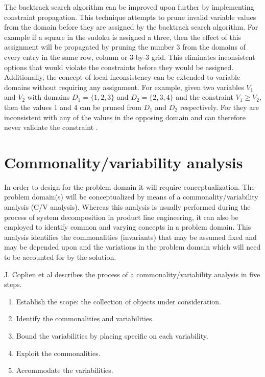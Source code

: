 The backtrack search algorithm can be improved upon further by implementing constraint propagation. This technique attempts to prune invalid variable values from the domain before they are assigned by the backtrack search algorithm. For example if a square in the sudoku is assigned a three, then the effect of this assignment will be propagated by pruning the number 3 from the domains of every entry in the same row, column or 3-by-3 grid. This eliminates inconsistent options that would violate the constraints before they would be assigned. Additionally, the concept of local inconsistency can be extended to variable domains without requiring any assignment. For example, given two variables $V_1$ and $V_2$ with domains $D_1=\{1,2,3\}$ and $D_2=\{2,3,4\}$ and the constraint $V_1 \geq V_2$, then the values 1 and 4 can be pruned from $D_1$ and $D_2$ respectively. For they are inconsistent with any of the values in the opposing domain and can therefore never validate the constraint \cite{constraint_general, constraint_algorithm}.
\section{Commonality/variability analysis}
\label{sec:back:cv_analysis}
In order to design for the problem domain it will require conceptualization. The problem domain(s) will be conceptualized by means of a commonality/variability analysis (C/V analysis). Whereas this analysis is usually performed during the process of system decomposition in product line engineering, it can also be employed to identify common and varying concepts in a problem domain. This analysis identifies the commonalities (invariants) that may be assumed fixed and may be depended upon and the variations in the problem domain which will need to be accounted for by the solution.

J. Coplien et al \cite{cv_analysis} describes the process of a commonality/variability analysis in five steps.
\begin{enumerate}
\nospace
\item Establish the scope: the collection of objects
under consideration.
\item Identify the commonalities and variabilities.
\item Bound the variabilities by placing specific on each variability.
\item Exploit the commonalities.
\item Accommodate the variabilities.
\end{enumerate}

